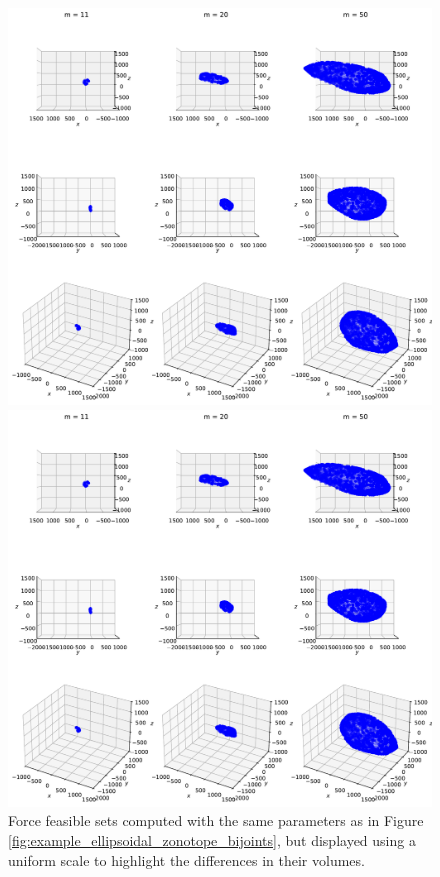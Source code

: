 \begin{figure}[!htb]
\begin{minipage}{1\linewidth}
    \end{minipage}
    \begin{minipage}{1\linewidth}
        \centering
        \includegraphics[trim={0 255 0 300},clip, width=0.9\linewidth]{img/chapter_3/zonotopes_looks_like_ellipsoids_2_same_scale.pdf}
    \end{minipage}
    \begin{minipage}{1\linewidth}
        \centering
        \includegraphics[trim={0 0 0 500},clip, width=0.9\linewidth]{img/chapter_3/zonotopes_looks_like_ellipsoids_2_same_scale.pdf}
    \end{minipage}
    
    \caption{Force feasible sets computed with the same parameters as in Figure \ref{fig:example_ellipsoidal_zonotope_bijoints}, but displayed using a uniform scale to highlight the differences in their volumes.}
    \label{fig:example_ellipsoidal_zonotope_bijoints_same_scale}
\end{figure}


